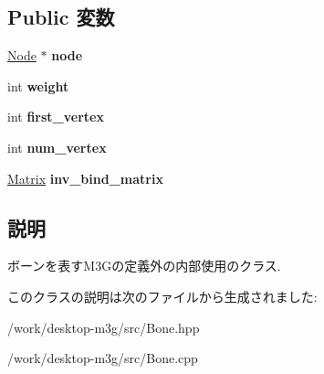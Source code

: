 \subsection*{Public 変数}
\begin{CompactItemize}
\item 
\hypertarget{classm3g_1_1Bone_b88cd70dad2e152cea983610f2a16e68}{
\hyperlink{classm3g_1_1Node}{Node} $\ast$ \textbf{node}}
\label{classm3g_1_1Bone_b88cd70dad2e152cea983610f2a16e68}

\item 
\hypertarget{classm3g_1_1Bone_a01147b1f07072d246c76dc85d69df7c}{
int \textbf{weight}}
\label{classm3g_1_1Bone_a01147b1f07072d246c76dc85d69df7c}

\item 
\hypertarget{classm3g_1_1Bone_f6fef1fff206a6d6fcfcc1287b45ace6}{
int \textbf{first\_\-vertex}}
\label{classm3g_1_1Bone_f6fef1fff206a6d6fcfcc1287b45ace6}

\item 
\hypertarget{classm3g_1_1Bone_f130b7ed1451b2713ca985fd292e2e4a}{
int \textbf{num\_\-vertex}}
\label{classm3g_1_1Bone_f130b7ed1451b2713ca985fd292e2e4a}

\item 
\hypertarget{classm3g_1_1Bone_564e81227889d6b0b01e707d49f26f10}{
\hyperlink{classm3g_1_1Matrix}{Matrix} \textbf{inv\_\-bind\_\-matrix}}
\label{classm3g_1_1Bone_564e81227889d6b0b01e707d49f26f10}

\end{CompactItemize}


\subsection{説明}
ボーンを表すM3Gの定義外の内部使用のクラス. 

このクラスの説明は次のファイルから生成されました:\begin{CompactItemize}
\item 
/work/desktop-m3g/src/Bone.hpp\item 
/work/desktop-m3g/src/Bone.cpp\end{CompactItemize}

